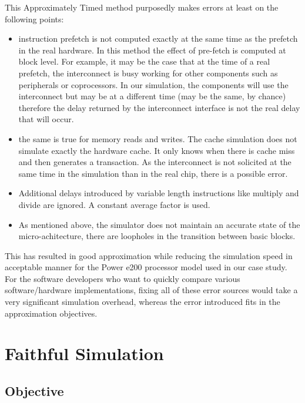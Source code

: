 \documentclass{llncs}
\begin{document}
This Approximately Timed method purposedly makes errors at
least on the following points:
\begin{itemize}
\item instruction prefetch is not computed exactly at the same time as
  the prefetch in the real hardware. In this method the effect of
  pre-fetch is computed at block level. For example, it may be the
  case that at the time of a real prefetch, the interconnect is busy
  working for other components such as peripherals or coprocessors. In
  our simulation, the components will use the interconnect but may be
  at a different time (may be the same, by chance) therefore the delay
  returned by the interconnect interface is not the real delay that
  will occur.

\item the same is true for memory reads and writes. The cache
  simulation does not simulate exactly the hardware
  cache. It only knows when there is cache miss and then generates a
  transaction.  As the interconnect is not solicited at the same time
  in the simulation than in the real chip, there is a possible error.

\item Additional delays introduced by variable length instructions like
  multiply and divide are ignored. A constant average factor is used.
\item As mentioned above, the simulator does not maintain an accurate
  state of the micro-achitecture, there are loopholes in the
  transition between basic blocks.
\end{itemize}

This has resulted in good approximation while reducing the
simulation speed in acceptable manner for the Power e200 processor
model used in our case study. For the software developers who want to
quickly compare various software/hardware implementations, fixing all
of these error sources would take a very significant simulation
overhead, whereas the error introduced fits in the approximation
objectives.

\section{Faithful Simulation}
\label{verification}

\subsection{Objective}
\end{document}

